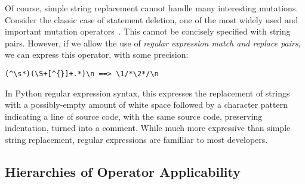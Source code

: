 \documentclass[acmsmall,screen,review,anonymous]{acmart}
\begin{document}
Of course, simple string replacement cannot handle
many interesting mutations.  Consider the classic case of statement
deletion, one of the most widely used and important mutation
operators~\cite{deng2013empirical}. This cannot be concisely specified with string pairs. 
However, if we allow the use of
\emph{regular expression match and replace pairs}, we can express this operator, with some precision:

\begin{verbatim}
(^\s*)(\S+[^{}]+.*)\n ==> \1/*\2*/\n
\end{verbatim}

In Python regular expression syntax, this expresses the replacement of
strings with a possibly-empty amount of white space followed by a
character pattern indicating a line of source code, with the same
source code, preserving indentation, turned into a comment.
While much more expressive than simple string replacement, regular
expressions are familliar to most developers.





\subsection{Hierarchies of Operator Applicability}
\end{document}
